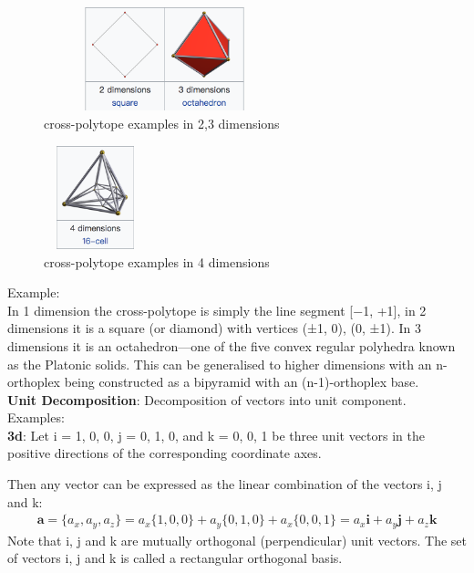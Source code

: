 \documentclass[fontsize=12pt,a4paper]{article}
\begin{document}
\begin{figure}[!htb]
\centering
  \includegraphics[width=7cm,height = 3cm]{2-3.png}
  \caption{cross-polytope examples in 2,3 dimensions}
\end{figure}

\begin{figure}[!htb]
\centering
  \includegraphics[width=3cm,height = 3cm]{4.png}
  \caption{cross-polytope examples in 4 dimensions}
\end{figure}


Example:\\
In 1 dimension the cross-polytope is simply the line segment [−1, +1], in 2 dimensions it is a square (or diamond) with vertices {(±1, 0), (0, ±1)}. In 3 dimensions it is an octahedron—one of the five convex regular polyhedra known as the Platonic solids. This can be generalised to higher dimensions with an n-orthoplex being constructed as a bipyramid with an (n-1)-orthoplex base.\\



\textbf{Unit Decomposition}: Decomposition of vectors into unit component.\\

Examples:\\
\textbf{3d}: Let i = {1, 0, 0}, j = {0, 1, 0}, and k = {0, 0, 1} be three unit vectors in the positive directions of the corresponding coordinate axes.

Then any vector  can be expressed as the linear combination of the vectors i, j and k:
\begin{align}
    \textbf{a} = \{a_x,a_y,a_z\} = a_x\{1,0,0\}+a_y\{0,1,0\}+a_x\{0,0,1\} = a_x\textbf{i}+a_y\textbf{j}+a_z\textbf{k}
\end{align}
Note that i, j and k are mutually orthogonal (perpendicular) unit vectors. The set of vectors i, j and k is called a rectangular orthogonal basis.
\end{document}
